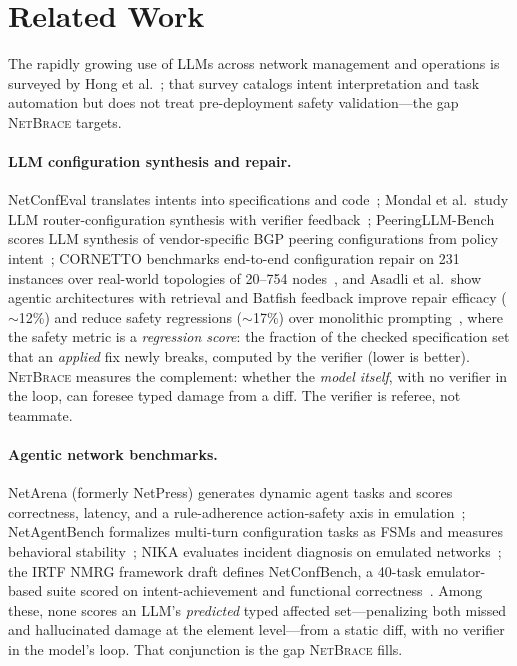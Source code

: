 \documentclass[11pt]{article}
\newcommand{\netbrace}{\textsc{NetBrace}}
\begin{document}
\section{Related Work}
\label{sec:related}

The rapidly growing use of LLMs across network management and operations is
surveyed by Hong et al.~\cite{hong2025llmnetmgmt}; that survey catalogs intent
interpretation and task automation but does not treat pre-deployment safety
validation---the gap \netbrace{} targets.

\paragraph{LLM configuration synthesis and repair.} NetConfEval translates
intents into specifications and code~\cite{netconfeval}; Mondal et al.\
study LLM router-configuration synthesis with verifier
feedback~\cite{mondal}; PeeringLLM-Bench scores LLM synthesis of
vendor-specific {BGP} peering configurations from policy
intent~\cite{peeringllmbench}; CORNETTO benchmarks end-to-end
configuration repair
on 231 instances over real-world topologies of 20--754
nodes~\cite{cornetto}, and Asadli et al.\
show agentic architectures with retrieval and Batfish feedback improve
repair efficacy ($\sim$12\%) and reduce safety regressions
($\sim$17\%) over monolithic
prompting~\cite{ethagentic}, where the safety metric is a \emph{regression
score}: the fraction of the checked specification set that an
\emph{applied} fix newly breaks, computed by the verifier (lower is
better). \netbrace{} measures the complement: whether the \emph{model
itself}, with no verifier in the loop, can foresee typed damage from a diff.
The verifier is referee, not teammate.

\paragraph{Agentic network benchmarks.} NetArena (formerly NetPress)
generates dynamic agent tasks and scores correctness, latency, and a
rule-adherence action-safety axis in emulation~\cite{netarena};
NetAgentBench formalizes multi-turn configuration tasks as FSMs and
measures behavioral stability~\cite{netagentbench}; NIKA evaluates incident
diagnosis on emulated networks~\cite{nika}; the IRTF NMRG framework draft
defines NetConfBench, a 40-task emulator-based suite scored on
intent-achievement and functional correctness~\cite{nmrg}. Among these,
none scores an LLM's \emph{predicted} typed affected set---penalizing both
missed and hallucinated damage at the element level---from a static diff,
with no verifier in the model's loop. That conjunction is the gap
\netbrace{} fills.
\end{document}

